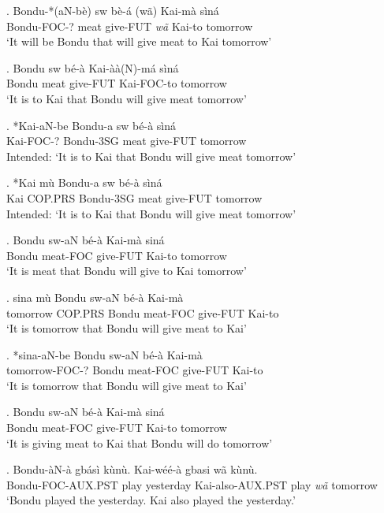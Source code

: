 \documentclass{assets/fieldnotes}
\begin{document}
\exg. Bondu-*(aN-bè) sw bè-á (wã) Kai-mà sìná\\
Bondu-FOC-? meat give-FUT \textit{wã} Kai-to tomorrow\\
`It will be Bondu that will give meat to Kai tomorrow'

\exg. Bondu sw bé-à Kai-àà(N)-má sìná\\
Bondu meat give-FUT Kai-FOC-to tomorrow\\
`It is to Kai that Bondu will give meat tomorrow'

\exg. *Kai-aN-be Bondu-a sw bé-à sìná\\
Kai-FOC-? Bondu-3SG meat give-FUT tomorrow\\
Intended: `It is to Kai that Bondu will give meat tomorrow'

\exg. *Kai mù Bondu-a sw bé-à sìná\\
Kai COP.PRS Bondu-3SG meat give-FUT tomorrow\\
Intended: `It is to Kai that Bondu will give meat tomorrow'

\exg. Bondu sw-aN bé-à Kai-mà siná\\
Bondu meat-FOC give-FUT Kai-to tomorrow\\
`It is meat that Bondu will give to Kai tomorrow'

\exg. sina mù Bondu sw-aN bé-à Kai-mà\\
tomorrow COP.PRS Bondu meat-FOC give-FUT Kai-to\\
`It is tomorrow that Bondu will give meat to Kai'

\exg. *sina-aN-be Bondu sw-aN bé-à Kai-mà\\
tomorrow-FOC-? Bondu meat-FOC give-FUT Kai-to\\
`It is tomorrow that Bondu will give meat to Kai'

\exg. Bondu sw-aN bé-à Kai-mà siná\\
Bondu meat-FOC give-FUT Kai-to tomorrow\\
`It is giving meat to Kai that Bondu will do tomorrow'

\exg. Bondu-àN-à  gbásì kùnù. Kai-wéé-à  gbasi wã kùnù.\\
Bondu-FOC-AUX.PST  play yesterday Kai-also-AUX.PST  play \textit{wã} tomorrow\\
`Bondu played the  yesterday. Kai also played the  yesterday.'
\end{document}
